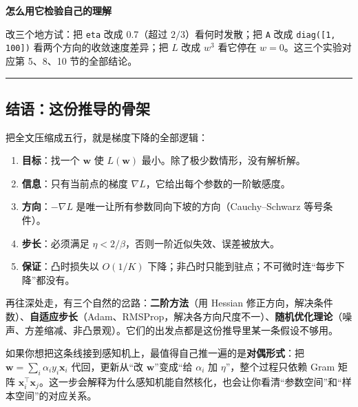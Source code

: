 \documentclass[UTF8, a4paper, zihao=-4, fontset=none]{ctexart}
\begin{document}
\begin{goodbox}
{\bfseries\sffamily\small\color{good} 怎么用它检验自己的理解}\par\vspace{2pt}
改三个地方试：把 \texttt{eta} 改成 0.7（超过 $2/3$）看何时发散；把 \texttt{A} 改成 \texttt{diag([1, 100])} 看两个方向的收敛速度差异；把 $L$ 改成 $w^3$ 看它停在 $w=0$。这三个实验对应第 5、8、10 节的全部结论。


\end{goodbox}




\par\medskip\noindent\rule{\linewidth}{0.4pt}\medskip\par




\subsection*{结语：这份推导的骨架}



把全文压缩成五行，就是梯度下降的全部逻辑：



\begin{enumerate}
\item \textbf{目标}：找一个 $\mathbf{w}$ 使 $L(\mathbf{w})$ 最小。除了极少数情形，没有解析解。
\item \textbf{信息}：只有当前点的梯度 $\nabla L$，它给出每个参数的一阶敏感度。
\item \textbf{方向}：$-\nabla L$ 是唯一让所有参数同向下坡的方向（Cauchy–Schwarz 等号条件）。
\item \textbf{步长}：必须满足 $\eta<2/\beta$，否则一阶近似失效、误差被放大。
\item \textbf{保证}：凸时损失以 $O(1/K)$ 下降；非凸时只能到驻点；不可微时连“每步下降”都没有。
\end{enumerate}



再往深处走，有三个自然的岔路：\textbf{二阶方法}（用 Hessian 修正方向，解决条件数）、\textbf{自适应步长}（Adam、RMSProp，解决各方向尺度不一）、\textbf{随机优化理论}（噪声、方差缩减、非凸景观）。它们的出发点都是这份推导里某一条假设不够用。



如果你想把这条线接到感知机上，最值得自己推一遍的是\textbf{对偶形式}：把 $\mathbf{w}=\sum_i\alpha_iy_i\mathbf{x}_i$ 代回，更新从“改 $\mathbf{w}$”变成“给 $\alpha_i$ 加 $\eta$”，整个过程只依赖 Gram 矩阵 $\mathbf{x}_i^\top\mathbf{x}_j$。这一步会解释为什么感知机能自然核化，也会让你看清“参数空间”和“样本空间”的对应关系。
\end{document}
